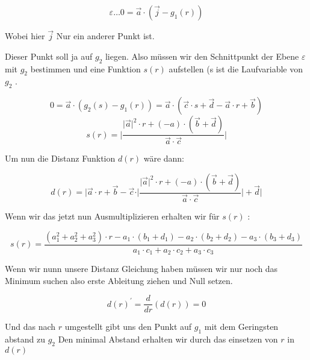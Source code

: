 \documentclass{article}
\begin{document}
\begin{equation}
	\varepsilon \dots 0 = \overrightarrow{a} \cdot ( \overrightarrow{j} - g_1(r))
\end{equation}

Wobei hier \( \overrightarrow{j} \) Nur ein anderer Punkt ist.


Dieser Punkt soll ja auf \( g_2 \) liegen. Also müssen wir den Schnittpunkt der Ebene \( \varepsilon \) mit \( g_2 \) bestimmen und eine Funktion \( s(r) \) aufstellen (s ist die Laufvariable von \( g_2 \) .

\begin{equation}
	0 = \overrightarrow{a} \cdot (g_2(s) - g_1(r)) = \overrightarrow{a} \cdot ( \overrightarrow{c} \cdot s +  \overrightarrow{d} - \overrightarrow{a} \cdot r + \overrightarrow{b} ) 
\end{equation}
\begin{equation}
	s(r) = \vert \frac{ \vert \overrightarrow{a} \vert ^ 2 \cdot r + (- a) \cdot ( \overrightarrow{b} + \overrightarrow{d})}{ \overrightarrow{a} \cdot \overrightarrow{c}} \vert
\end{equation}

Um nun die Distanz Funktion \( d( r ) \) wäre dann:

\begin{equation}
	d(r) = \vert \overrightarrow{a} \cdot r + \overrightarrow{b} - \overrightarrow{c} \cdot  \vert \frac{ \vert \overrightarrow{a} \vert ^ 2 \cdot r + (- a) \cdot ( \overrightarrow{b} + \overrightarrow{d})}{ \overrightarrow{a} \cdot \overrightarrow{c}} \vert + \overrightarrow{d} \vert
\end{equation}

Wenn wir das jetzt nun Ausmultiplizieren erhalten wir für \( s(r) \) :

\begin{equation}
	s(r) = \frac{ ( a_1^2 + a_2^2 + a_3^2 ) \cdot r - a_1 \cdot (b_1 + d_1) - a_2 \cdot (b_2 + d_2 ) - a_3 \cdot (b_3 + d_3) }{ a_1 \cdot c_1 + a_2 \cdot c_2 + a_3 \cdot c_3}
\end{equation}

Wenn wir nunn unsere Distanz Gleichung haben müssen wir nur noch das Minimum suchen also erste Ableitung ziehen und Null setzen.

\begin{equation}
	d(r)^{\prime} = \frac{d}{d r} ( d(r) ) = 0
\end{equation}

Und das nach \( r \) umgestellt gibt uns den Punkt auf \( g_1 \) mit dem Geringsten abstand zu \( g_2 \) Den minimal Abstand erhalten wir durch das einsetzen von \( r \) in \( d(r) \) \newline
\end{document}
